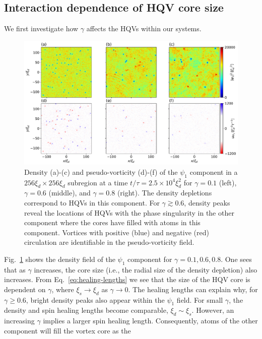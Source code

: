 \subsection{Interaction dependence of HQV core size}
We first investigate how $\gamma$ affects the HQVs within our systems.
\begin{figure}
    \centering
    \includegraphics[width=\textwidth]{gfx/ch-twoCompDynamics/densVort.pdf}
    \caption{Density (a)-(c) and pseudo-vorticity (d)-(f) of the $\psi_1$
    component in a $256\xi_d \times 256\xi_d$ subregion at a time 
    $t/\tau=2.5\times 10^4\xi_d^2$ for $\gamma=0.1$ (left),
    $\gamma=0.6$ (middle), and $\gamma=0.8$ (right).
    The density depletions correspond to HQVs in this component.
    For $\gamma \gtrsim 0.6$, density peaks reveal the locations of HQVs with
    the phase singularity in the other component where the cores have filled
    with atoms in this component.
    Vortices with positive (blue) and negative (red) circulation are
    identifiable in the pseudo-vorticity field.}
    \label{fig:density-pseudo-vort}
\end{figure}
Fig.~\ref{fig:density-pseudo-vort} shows the density field of the $\psi_1$
component for $\gamma = 0.1, 0.6, 0.8$.
One sees that as $\gamma$ increases, the core size (i.e., the radial size of the
density depletion) also increases.
From Eq.~\eqref{eq:healing-lengths} we see that the size of the HQV core is
dependent on $\gamma$, where $\xi_s \rightarrow \xi_d$ as
$\gamma \rightarrow 0$.
The healing lengths can explain why, for $\gamma \geq 0.6$, bright density
peaks also appear within the $\psi_1$ field.
For small $\gamma$, the density and spin healing lengths become comparable,
$\xi_d \sim \xi_s$.
However, an increasing $\gamma$ implies a larger spin healing length.
Consequently, atoms of the other component will fill the vortex core as the
